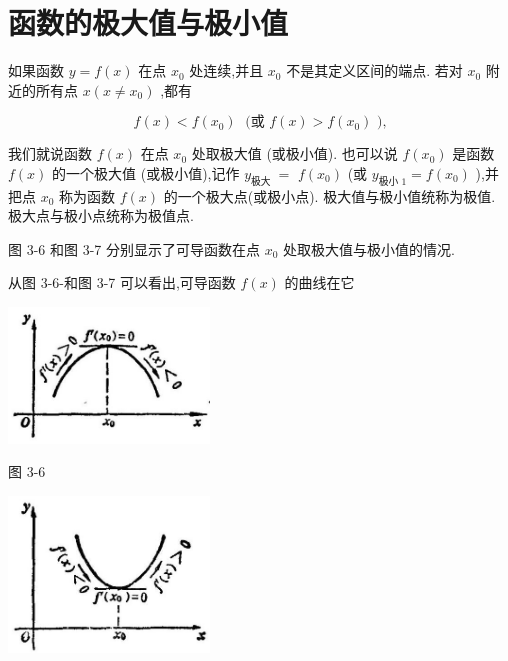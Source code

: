 \documentclass[lang=cn,newtx,12pt,scheme=chinese]{elegantbook}
\begin{document}
\section{函数的极大值与极小值}

\begin{definition}[函数的极值点]

如果函数 \(y = f\left( x\right)\) 在点 \({x}_{0}\) 处连续,并且 \({x}_{0}\) 不是其定义区间的端点. 若对 \({x}_{0}\) 附近的所有点 \(x\left( {x \neq {x}_{0}}\right)\) ,都有

\[
f\left( x\right) < f\left( {x}_{0}\right) \;\text{ (或 }f\left( x\right) > f\left( {x}_{0}\right) \text{ ),}
\]

我们就说函数 \(f\left( x\right)\) 在点 \({x}_{0}\) 处取极大值 (或极小值). 也可以说 \(f\left( {x}_{0}\right)\) 是函数 \(f\left( x\right)\) 的一个极大值 (或极小值),记作 \({y}_{\text{极大 }} =\) \(f\left( {x}_{0}\right)\) (或 \({y}_{\text{极小 }1} = f\left( {x}_{0}\right)\) ),并把点 \({x}_{0}\) 称为函数 \(f\left( x\right)\) 的一个极大点(或极小点). 极大值与极小值统称为极值. 极大点与极小点统称为极值点.

\end{definition}

图 3-6 和图 3-7 分别显示了可导函数在点 \({x}_{0}\) 处取极大值与极小值的情况.

从图 3-6-和图 3-7 可以看出,可导函数 \(f\left( x\right)\) 的曲线在它

\begin{center}
\includegraphics[max width=0.4\textwidth]{images/01912c18-5c3f-733d-b775-749ba9897a9d_141_386711.jpg}
\end{center}

图 3-6

\begin{center}
\includegraphics[max width=0.4\textwidth]{images/01912c18-5c3f-733d-b775-749ba9897a9d_141_950727.jpg}
\end{center}
\end{document}

